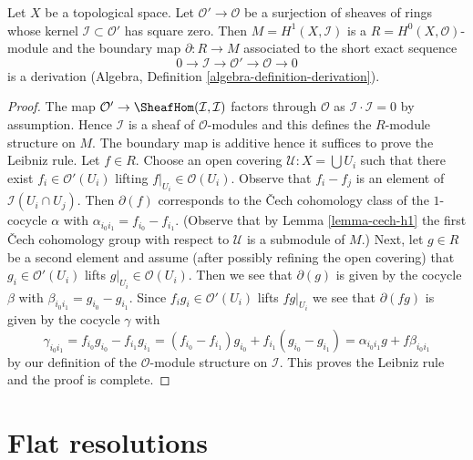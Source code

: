 \begin{lemma}
\label{lemma-boundary-derivation-over-cup-product}
Let $X$ be a topological space. Let $\mathcal{O}' \to \mathcal{O}$ be a
surjection of sheaves of rings whose kernel $\mathcal{I} \subset \mathcal{O}'$
has square zero. Then $M = H^1(X, \mathcal{I})$ is a
$R = H^0(X, \mathcal{O})$-module and the boundary map
$\partial : R \to M$ associated to the short exact sequence
$$
0 \to \mathcal{I} \to \mathcal{O}' \to \mathcal{O} \to 0
$$
is a derivation (Algebra, Definition \ref{algebra-definition-derivation}).
\end{lemma}

\begin{proof}
The map $\mathcal{O}' \to \SheafHom(\mathcal{I}, \mathcal{I})$
factors through $\mathcal{O}$ as $\mathcal{I} \cdot \mathcal{I} = 0$
by assumption. Hence $\mathcal{I}$ is a sheaf of $\mathcal{O}$-modules
and this defines the $R$-module structure on $M$.
The boundary map is additive hence it suffices to prove
the Leibniz rule. Let $f \in R$. Choose an open covering
$\mathcal{U} : X = \bigcup U_i$ such that there exist
$f_i \in \mathcal{O}'(U_i)$ lifting $f|_{U_i} \in \mathcal{O}(U_i)$.
Observe that $f_i - f_j$ is an element of $\mathcal{I}(U_i \cap U_j)$.
Then $\partial(f)$ corresponds to the {\v C}ech cohomology class of
the $1$-cocycle $\alpha$ with $\alpha_{i_0i_1} = f_{i_0} - f_{i_1}$.
(Observe that by Lemma \ref{lemma-cech-h1} the first {\v C}ech cohomology
group with respect to $\mathcal{U}$ is a submodule of $M$.)
Next, let $g \in R$ be a second element and assume (after possibly
refining the open covering) that $g_i \in \mathcal{O}'(U_i)$ lifts
$g|_{U_i} \in \mathcal{O}(U_i)$. Then we see that
$\partial(g)$ is given by the cocycle $\beta$ with
$\beta_{i_0i_1} = g_{i_0} - g_{i_1}$. Since $f_ig_i \in \mathcal{O}'(U_i)$
lifts $fg|_{U_i}$ we see that
$\partial(fg)$ is given by the cocycle $\gamma$ with
$$
\gamma_{i_0i_1} = f_{i_0}g_{i_0} - f_{i_1}g_{i_1} =
(f_{i_0} - f_{i_1})g_{i_0} + f_{i_1}(g_{i_0} - g_{i_1}) =
\alpha_{i_0i_1}g + f\beta_{i_0i_1}
$$
by our definition of the $\mathcal{O}$-module structure on $\mathcal{I}$.
This proves the Leibniz rule and the proof is complete.
\end{proof}









\section{Flat resolutions}
\label{section-flat}

